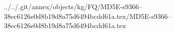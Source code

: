 ../../.git/annex/objects/kg/FQ/MD5E-s9366--38ec6126e0d8b19d8a75d6494bcdd61a.tex/MD5E-s9366--38ec6126e0d8b19d8a75d6494bcdd61a.tex